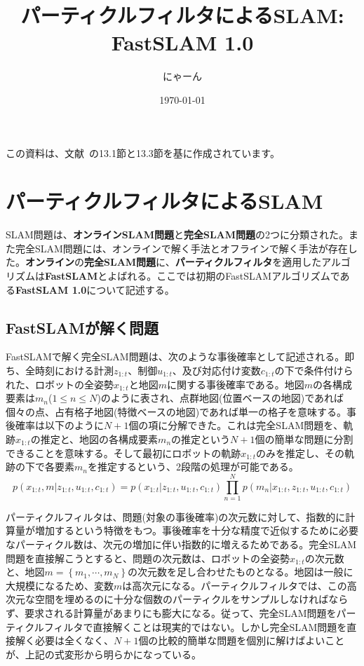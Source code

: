 \documentclass[dvipdfmx,a4paper]{jsarticle}
\title{パーティクルフィルタによるSLAM: FastSLAM 1.0}
\author{にゃーん}
\date{\today}
\begin{document}
\maketitle

この資料は、文献~\cite{Thrun07}の13.1節と13.3節を基に作成されています。

\section{パーティクルフィルタによるSLAM}
SLAM問題は、\textbf{オンラインSLAM問題}と\textbf{完全SLAM問題}の2つに分類された。また完全SLAM問題には、オンラインで解く手法とオフラインで解く手法が存在した。\textbf{オンライン}の\textbf{完全SLAM問題}に、\textbf{パーティクルフィルタ}を適用したアルゴリズムは\textbf{FastSLAM}とよばれる。ここでは初期のFastSLAMアルゴリズムである\textbf{FastSLAM 1.0}について記述する。

\subsection{FastSLAMが解く問題}
FastSLAMで解く完全SLAM問題は、次のような事後確率として記述される。即ち、全時刻における計測$z_{1 : t}$、制御$u_{1 : t}$、及び対応付け変数$c_{1 : t}$の下で条件付けられた、ロボットの全姿勢$x_{1 : t}$と地図$m$に関する事後確率である。地図$m$の各構成要素は$m_n$($1 \le n \le N$)のように表され、点群地図(位置ベースの地図)であれば個々の点、占有格子地図(特徴ベースの地図)であれば単一の格子を意味する。事後確率は以下のように$N + 1$個の項に分解できた。これは完全SLAM問題を、軌跡$x_{1 : t}$の推定と、地図の各構成要素$m_n$の推定という$N + 1$個の簡単な問題に分割できることを意味する。そして最初にロボットの軌跡$x_{1 : t}$のみを推定し、その軌跡の下で各要素$m_n$を推定するという、2段階の処理が可能である。
\begin{equation}
	p(x_{1 : t}, m | z_{1 : t}, u_{1 : t}, c_{1 : t}) = p(x_{1 : t} | z_{1 : t}, u_{1 : t}, c_{1 : t}) \prod_{n = 1}^N p(m_n | x_{1 : t}, z_{1 : t}, u_{1 : t}, c_{1 : t})
\end{equation}

パーティクルフィルタは、問題(対象の事後確率)の次元数に対して、指数的に計算量が増加するという特徴をもつ。事後確率を十分な精度で近似するために必要なパーティクル数は、次元の増加に伴い指数的に増えるためである。完全SLAM問題を直接解こうとすると、問題の次元数は、ロボットの全姿勢$x_{1 : t}$の次元数と、地図$m = \left\{ m_1, \cdots, m_N \right\}$の次元数を足し合わせたものとなる。地図は一般に大規模になるため、変数$m$は高次元になる。パーティクルフィルタでは、この高次元な空間を埋めるのに十分な個数のパーティクルをサンプルしなければならず、要求される計算量があまりにも膨大になる。従って、完全SLAM問題をパーティクルフィルタで直接解くことは現実的ではない。しかし完全SLAM問題を直接解く必要は全くなく、$N + 1$個の比較的簡単な問題を個別に解けばよいことが、上記の式変形から明らかになっている。\newline
\end{document}
